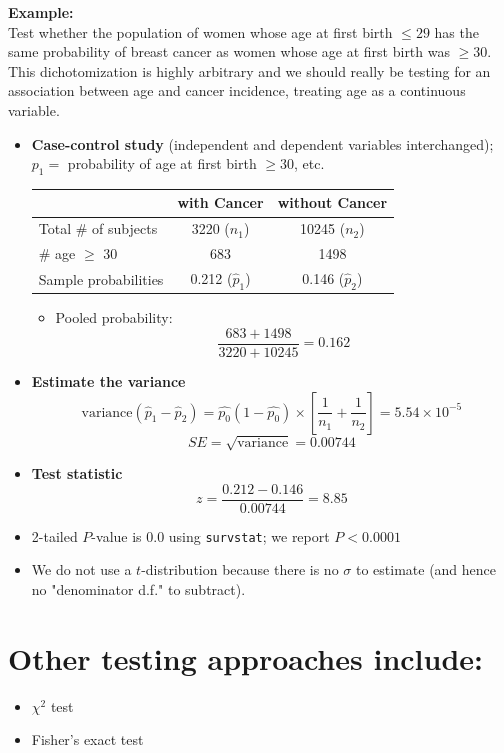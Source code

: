 \documentclass[14pt]{extarticle}
\begin{document}
\newpage

\noindent
\textbf{Example:} \\
Test whether the population of women whose age at first birth $\leq 29$ has the same probability of breast cancer as women whose age at first birth was $\geq 30$. This dichotomization is highly arbitrary and we should really be testing for an association between age and cancer incidence, treating age as a continuous variable.

\begin{itemize}
    \item \textbf{Case-control study} (independent and dependent variables interchanged); $p_1 = $ probability of age at first birth $\geq 30$, etc.
    
    \begin{center}
    \begin{tabular}{|l|c|c|}
    \hline
    & \textbf{with Cancer} & \textbf{without Cancer} \\
    \hline
    Total \# of subjects & 3220 ($n_1$) & 10245 ($n_2$) \\
    \# age $\geq$ 30     & 683  & 1498 \\
    \hline
    Sample probabilities & 0.212 ($\hat{p}_1$) & 0.146 ($\hat{p}_2$) \\
    \hline
    \end{tabular}
    \end{center}
    
    \begin{itemize}
        \item Pooled probability:
        \[
        \frac{683 + 1498}{3220 + 10245} = 0.162
        \]
    \end{itemize}

    \item \textbf{Estimate the variance}
    \[
    \text{variance}(\hat{p}_1 - \hat{p}_2) = \hat{p_0}(1 - \hat{p_0}) \times \left[ \frac{1}{n_1} + \frac{1}{n_2} \right] = 5.54 \times 10^{-5}
    \]
    \[
    SE = \sqrt{\text{variance}} = 0.00744
    \]
    
    \item \textbf{Test statistic}
    \[
    z = \frac{0.212 - 0.146}{0.00744} = 8.85
    \]
    
    \item 2-tailed $P$-value is 0.0 using \texttt{survstat}; we report $P < 0.0001$

    \item We do not use a $t$-distribution because there is no $\sigma$ to estimate (and hence no "denominator d.f." to subtract).
\end{itemize}


\section*{Other testing approaches include:}

\begin{itemize}
    \item $\chi^2$ test
    \item Fisher's exact test
\end{itemize}
\end{document}
